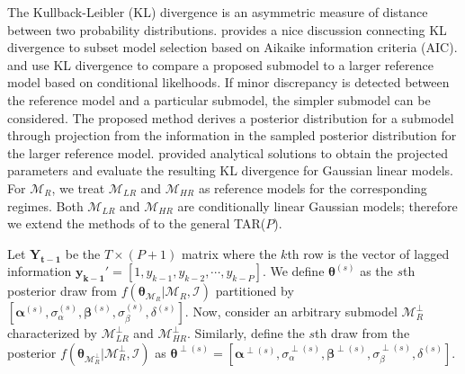 The Kullback-Leibler (KL) divergence is an asymmetric measure of distance between two probability distributions\citep{Kullback1951}. \cite{burnham2003} provides a nice discussion connecting KL divergence to subset model selection based on Aikaike information criteria (AIC). \cite{Goutis1998} and \cite{Dupuis2003} use KL divergence to compare a proposed submodel to a larger reference model based on conditional likelhoods. If minor discrepancy is detected between the reference model and a particular submodel, the simpler submodel can be considered. The proposed method derives a posterior distribution for a submodel through projection from the information in the sampled posterior distribution for the larger reference model. \cite{Piironen2017} provided analytical solutions to obtain the projected parameters and evaluate the resulting KL divergence for Gaussian linear models. For $\mathcal{M}_R$, we treat $\mathcal{M}_{LR}$ and $\mathcal{M}_{HR}$ as reference models for the corresponding regimes. Both $\mathcal{M}_{LR}$ and $\mathcal{M}_{HR}$ are conditionally linear Gaussian models; therefore we extend the methods of \cite{Piironen2017} to the general TAR($P$). 

Let $\bm{Y_{t-1}}$ be the $T\times(P+1)$ matrix where the $k$th row is the vector of lagged information $\bm{y_{k-1}}'=[1,y_{k-1},y_{k-2},\cdots,y_{k-P}]$. We define $\bm{\theta}^{(s)}$ as the $s$th posterior draw from $f(\bm{\theta}_{\mathcal{M}_R}|\mathcal{M}_R,\mathcal{I})$ partitioned by $[\bm{\alpha}^{(s)},\sigma_\alpha^{(s)},\bm{\beta}^{(s)},\sigma_\beta^{(s)},\delta^{(s)}]$. Now, consider an arbitrary submodel $\mathcal{M}^\perp_{R}$ characterized by  $\mathcal{M}^\perp_{LR}$ and $\mathcal{M}^\perp_{HR}$. Similarly, define the $s$th draw from the posterior $f(\bm{\theta}_{\mathcal{M}^\perp_R}|\mathcal{M}^\perp_R,\mathcal{I})$  as $\bm{\theta}^{\perp(s)}=[\bm{\alpha}^{\perp(s)},\sigma_\alpha^{\perp(s)},\bm{\beta}^{\perp(s)},\sigma_\beta^{\perp(s)},\delta^{(s)}]$.  
 

